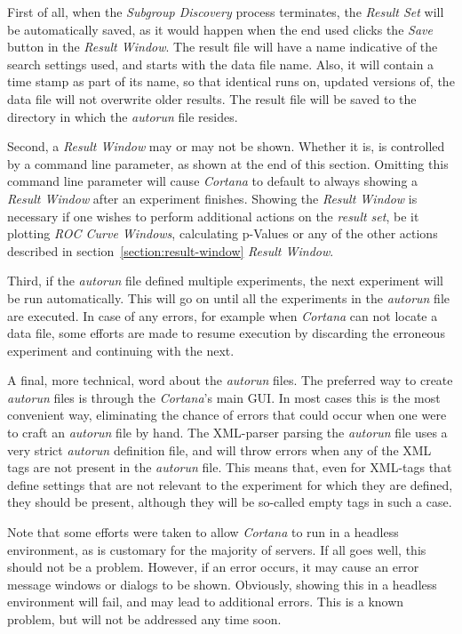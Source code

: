 \documentclass{article}
\begin{document}
First of all, when the \emph{Subgroup Discovery} process terminates, the \emph{Result Set} will be automatically saved, as it would happen when the end used clicks the \emph{Save} button in the \emph{Result Window}.
The result file will have a name indicative of the search settings used, and starts with the data file name.
Also, it will contain a time stamp as part of its name, so that identical runs on, updated versions of, the data file will not overwrite older results.
The result file will be saved to the directory in which the \emph{autorun} file resides.

Second, a \emph{Result Window} may or may not be shown.
Whether it is, is controlled by a command line parameter, as shown at the end of this section.
Omitting this command line parameter will cause \emph{Cortana} to default to always showing a \emph{Result Window} after an experiment finishes.
Showing the \emph{Result Window} is necessary if one wishes to perform additional actions on the \emph{result set}, be it plotting \emph{ROC Curve Windows}, calculating p-Values or any of the other actions described in section~\ref{section:result-window} \emph{Result Window}.

Third, if the \emph{autorun} file defined multiple experiments, the next experiment will be run automatically.
This will go on until all the experiments in the \emph{autorun} file are executed.
In case of any errors, for example when \emph{Cortana} can not locate a data file, some efforts are made to resume execution by discarding the erroneous experiment and continuing with the next.

A final, more technical, word about the \emph{autorun} files.
The preferred way to create \emph{autorun} files is through the \emph{Cortana}'s main GUI.
In most cases this is the most convenient way, eliminating the chance of errors that could occur when one were to craft an \emph{autorun} file by hand.
The XML-parser parsing the \emph{autorun} file uses a very strict \emph{autorun} definition file, and will throw errors when any of the XML tags are not present in the \emph{autorun} file.
This means that, even for XML-tags that define settings that are not relevant to the experiment for which they are defined, they should be present, although they will be so-called empty tags in such a case.

Note that some efforts were taken to allow \emph{Cortana} to run in a headless environment, as is customary for the majority of servers.
If all goes well, this should not be a problem.
However, if an error occurs, it may cause an error message windows or dialogs to be shown.
Obviously, showing this in a headless environment will fail, and may lead to additional errors.
This is a known problem, but will not be addressed any time soon.
\end{document}
